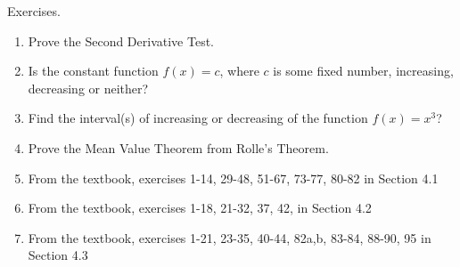 \documentclass[../main]{subfiles}
\begin{document}
%
%
Exercises.
\begin{enumerate}
\item Prove the Second Derivative Test.
\item Is the constant function \(f(x) = c\), where \(c\) is some fixed number, increasing, decreasing or neither?
\item Find the interval(s) of increasing or decreasing of the function \(f(x) = x^{3}\)?
\item Prove the Mean Value Theorem from Rolle's Theorem.
\item From the textbook, exercises  1-14, 29-48, 51-67, 73-77, 80-82 in Section 4.1%
\item From the textbook, exercises  1-18, 21-32, 37, 42,   in Section 4.2
\item From the textbook, exercises  1-21, 23-35, 40-44, 82a,b, 83-84, 88-90, 95 in Section 4.3%
\end{enumerate}
\end{document}
